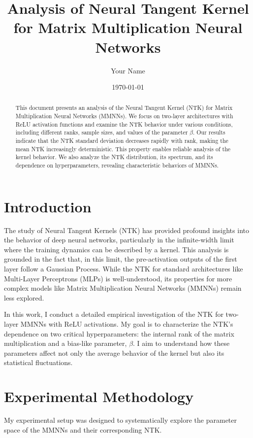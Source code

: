 \documentclass[12pt]{article}
\title{Analysis of Neural Tangent Kernel for Matrix Multiplication Neural Networks}
\author{Your Name}
\date{\today}
\begin{document}
\maketitle

\begin{abstract}
This document presents an analysis of the Neural Tangent Kernel (NTK) for Matrix Multiplication Neural Networks (MMNNs). We focus on two-layer architectures with ReLU activation functions and examine the NTK behavior under various conditions, including different ranks, sample sizes, and values of the parameter $\beta$. Our results indicate that the NTK standard deviation decreases rapidly with rank, making the mean NTK increasingly deterministic. This property enables reliable analysis of the kernel behavior. We also analyze the NTK distribution, its spectrum, and its dependence on hyperparameters, revealing characteristic behaviors of MMNNs.
\end{abstract}

\section{Introduction}
The study of Neural Tangent Kernels (NTK) has provided profound insights into the behavior of deep neural networks, particularly in the infinite-width limit where the training dynamics can be described by a kernel. This analysis is grounded in the fact that, in this limit, the pre-activation outputs of the first layer follow a Gaussian Process. While the NTK for standard architectures like Multi-Layer Perceptrons (MLPs) is well-understood, its properties for more complex models like Matrix Multiplication Neural Networks (MMNNs) remain less explored.

In this work, I conduct a detailed empirical investigation of the NTK for two-layer MMNNs with ReLU activations. My goal is to characterize the NTK's dependence on two critical hyperparameters: the internal rank of the matrix multiplication and a bias-like parameter, $\beta$. I aim to understand how these parameters affect not only the average behavior of the kernel but also its statistical fluctuations.

\section{Experimental Methodology}
My experimental setup was designed to systematically explore the parameter space of the MMNNs and their corresponding NTK.
\end{document}
